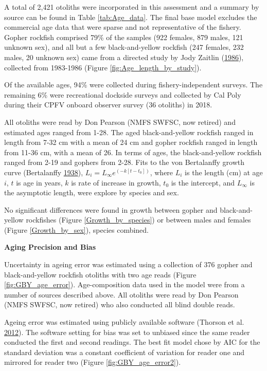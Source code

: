 \documentclass[12pt,]{article}
\begin{document}
A total of 2,421 otoliths were incorporated in this assessment and a
summary by source can be found in Table \ref{tab:Age_data}. The final
base model excludes the commercial age data that were sparse and not
representative of the fishery. Gopher rockfish comprised 79\% of the
samples (922 females, 879 males, 121 unknown sex), and all but a few
black-and-yellow rockfish (247 females, 232 males, 20 unknown sex) came
from a directed study by Jody Zaitlin
(\protect\hyperlink{ref-Zaitlin1986}{1986}), collected from 1983-1986
(Figure \ref{fig:Age_length_by_study}).

Of the available ages, 94\% were collected during fishery-independent
surveys. The remaining 6\% were recreational dockside surveys and
collected by Cal Poly during their CPFV onboard observer survey (36
otoliths) in 2018.

All otoliths were read by Don Pearson (NMFS SWFSC, now retired) and
estimated ages ranged from 1-28. The aged black-and-yellow rockfish
ranged in length from 7-32 cm with a mean of 24 cm and gopher rockfish
ranged in length from 11-36 cm, with a mean of 26. In terms of ages, the
black-and-yellow rockfish ranged from 2-19 and gophers from 2-28. Fits
to the von Bertalanffy growth curve (Bertalanffy
\protect\hyperlink{ref-vonB1938}{1938}),
\(L_i = L_{\infty}e^{(-k[t-t_0])}\), where \(L_i\) is the length (cm) at
age \(i\), \(t\) is age in years, \(k\) is rate of increase in growth,
\(t_0\) is the intercept, and \(L_{\infty}\) is the asymptotic length,
were explore by species and sex.

No significant differences were found in growth between gopher and
black-and-yellow rockfishes (Figure \ref{Growth_by_species}) or between
males and females (Figure \ref{Growth_by_sex}), species combined.

\vspace{.5cm} \textbf{Aging Precision and Bias}

Uncertainty in ageing error was estimated using a collection of 376
gopher and black-and-yellow rockfish otoliths with two age reads (Figure
\ref{fig:GBY_age_error}). Age-composition data used in the model were
from a number of sources described above. All otoliths were read by Don
Pearson (NMFS SWFSC, now retired) who also conducted all blind double
reads.

Ageing error was estimated using publicly available software (Thorson et
al. \protect\hyperlink{ref-Thorson2012}{2012}). The software setting for
bias was set to unbiased since the same reader conducted the first and
second readings. The best fit model chose by AIC for the standard
deviation was a constant coefficient of variation for reader one and
mirrored for reader two (Figure \ref{fig:GBY_age_error2}).
\end{document}
